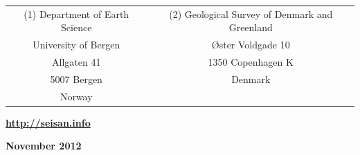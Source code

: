 \begin{titlepage}
\begin{center}
\vfill
\vfill
\vfill

\begin{tabular}{cc}
(1) Department of Earth Science & (2) Geological Survey of Denmark and Greenland \\
University of Bergen & \O ster Voldgade 10 \\
Allgaten 41 & 1350 Copenhagen K \\
5007 Bergen & Denmark \\
Norway &  \\
\end{tabular}

\vfill
\vfill
\vfill
\vfill
\vfill
\vfill
\vfill
\vfill
\textbf{\url{http://seisan.info}}

\textbf{November 2012}
\end{center}
\end{titlepage}

